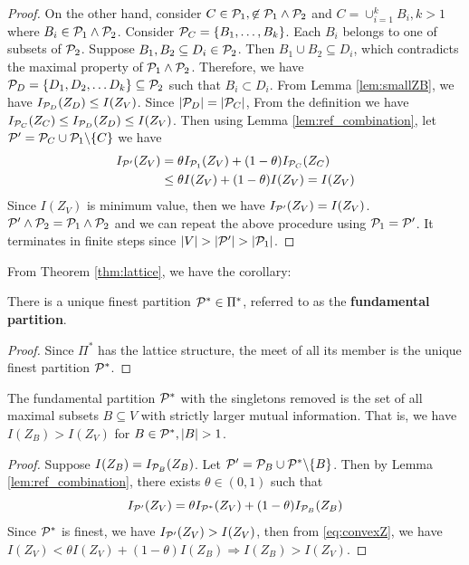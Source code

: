\documentclass{article}
\begin{document}
\begin{proof}
On the other hand, consider $C\in \P_1, \not\in \P_1\wedge\P_2$ and $C = \cup_{i=1}^k B_i, k>1$ where $B_i \in \P_1 \wedge \P_2$.
Consider $\P_C = \{B_1, \dots, B_k\}$. Each $B_i$ belongs to one of subsets of $\P_2$. Suppose $B_1, B_2 \subseteq D_i \in \P_2$. Then $B_1\cup B_2 \subseteq D_i$,
which contradicts the maximal property of $\P_1\wedge \P_2$. Therefore, we have $\P_D = \{D_1, D_2, \dots D_k\}\subseteq \P_2$ such that $B_i \subset D_i$.
From Lemma \ref{lem:smallZB}, we have $I_{\P_D}(Z_D) \leq I(Z_V)$. Since $\abs{\P_D} = \abs{\P_C}$, From the definition we have $I_{\P_C}(Z_C) \leq I_{\P_D}(Z_D) \leq I(Z_V)$.
Then using Lemma \ref{lem:ref_combination}, let $\P' = \P_C \cup \P_1\backslash \{C\}$ we have
\begin{align*}
I_{\P'}(Z_V) & = \theta I_{\P_1}(Z_V) + (1-\theta) I_{\P_C}(Z_C) \\
& \leq \theta I(Z_V) + (1- \theta)I(Z_V) = I(Z_V)
\end{align*} 
Since $I(Z_V)$ is minimum value, then we have $I_{\P'}(Z_V)=I(Z_V)$.
$\P'\wedge \P_2 = \P_1 \wedge \P_2$ and we can repeat the above procedure using $\P_1 = \P'$. It terminates in finite steps since $\abs{V} > \abs{\P'} > \abs{\P_1}$.
\end{proof}

From Theorem \ref{thm:lattice}, we have the corollary:
\begin{corollary}
There is a unique finest partition $\P^* \in \Pi^*$, referred to as the \textbf{fundamental partition}.
\end{corollary}
\begin{proof}
Since $\Pi^*$ has the lattice structure, the meet of all its member is the unique finest partition $\P^*$.
\end{proof}
\begin{theorem}\label{thm:strict_larger_mi}
The fundamental partition $\P^*$ with the singletons removed is the set of all maximal subsets $B \subseteq V$ with strictly larger mutual information. 
That is, we have
$I(Z_B) > I(Z_V)$ for $B \in \P^*, \abs{B}>1$.
\end{theorem}
\begin{proof}
Suppose $I(Z_B)=I_{\P_B}(Z_B)$.
Let $\P' = \P_B \cup  \P^* \backslash \{B\}$.
Then by Lemma \ref{lem:ref_combination}, there exists $\theta \in (0,1)$ such that 
\begin{equation}\label{eq:convexZ}
I_{\P'}(Z_V) = \theta I_{\P^*}(Z_V) + (1-\theta) I_{\P_B}(Z_B)
\end{equation}
Since $\P^*$ is finest, we have $I_{\P'}(Z_V) > I(Z_V)$, then from \eqref{eq:convexZ}, we have 
$I(Z_V) < \theta I(Z_V) + (1-\theta) I(Z_B) \Rightarrow I(Z_B) > I(Z_V)$.

\end{proof}
\end{document}

